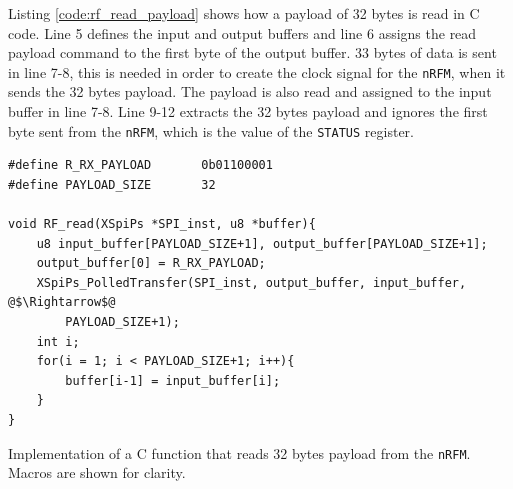 Listing \ref{code:rf_read_payload} shows how a payload of 32 bytes is read in C code. 
Line 5 defines the input and output buffers and line 6 assigns the read payload command to the first byte of the output buffer.
33 bytes of data is sent in line 7-8, this is needed in order to create the clock signal for the \texttt{nRFM}, when it sends the 32 bytes payload.
The payload is also read and assigned to the input buffer in line 7-8.
Line 9-12 extracts the 32 bytes payload and ignores the first byte sent from the \texttt{nRFM}, which is the value of the \texttt{STATUS} register.

\begin{listing}[!h]
\begin{verbatim}
#define R_RX_PAYLOAD       0b01100001
#define PAYLOAD_SIZE       32

void RF_read(XSpiPs *SPI_inst, u8 *buffer){
	u8 input_buffer[PAYLOAD_SIZE+1], output_buffer[PAYLOAD_SIZE+1];
	output_buffer[0] = R_RX_PAYLOAD;
	XSpiPs_PolledTransfer(SPI_inst, output_buffer, input_buffer, @$\Rightarrow$@
		PAYLOAD_SIZE+1);
	int i;
	for(i = 1; i < PAYLOAD_SIZE+1; i++){
		buffer[i-1] = input_buffer[i];
	}
}
\end{verbatim}
\caption[C function that reads 32 bytes payload from the nRFM]{Implementation of a C function that reads 32 bytes payload from the \texttt{nRFM}. Macros are shown for clarity.}
\label{code:rf_read_payload}
\end{listing}


